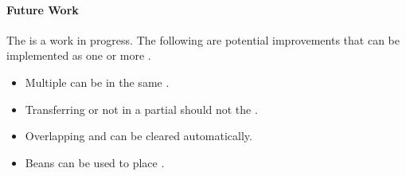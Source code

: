 \documentclass[class=article, crop=false]{standalone}
\begin{document}
\paragraph{Future Work}

The  is a work in progress. The following are potential improvements that can be implemented as one or more .

\begin{itemize}
    \item Multiple  can be  in the same .
    \item Transferring or   not  in a partial  should not  the .
    \item Overlapping  and  can be cleared automatically. 
    \item {} Beans can be used to place .
\end{itemize}
\end{document}
